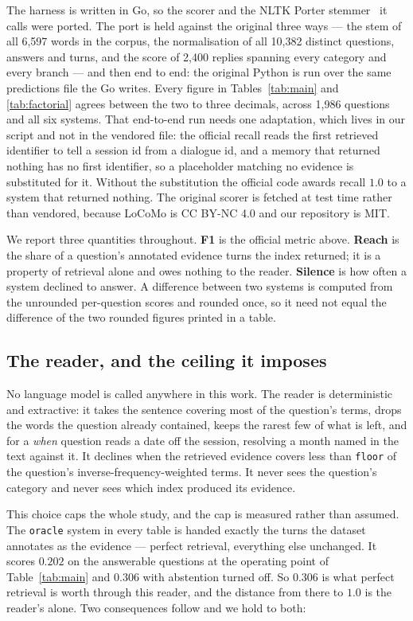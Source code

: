 \documentclass[11pt]{article}
\newcommand{\arm}[1]{\texttt{#1}}
\begin{document}
The harness is written in Go, so the scorer and the NLTK Porter
stemmer~\cite{porter,nltk} it calls were ported. The port is held against the
original three ways --- the stem of all 6{,}597 words in the corpus, the
normalisation of all 10{,}382 distinct questions, answers and turns, and the
score of 2{,}400 replies spanning every category and every branch --- and then
end to end: the original Python is run over the same predictions file the Go
writes. Every figure in Tables~\ref{tab:main} and \ref{tab:factorial} agrees
between the two to three decimals, across 1{,}986 questions and all six systems.
That end-to-end run needs one adaptation, which lives in our script and not in
the vendored file: the official recall reads the first retrieved identifier to
tell a session id from a dialogue id, and a memory that returned nothing has no
first identifier, so a placeholder matching no evidence is substituted for it.
Without the substitution the official code awards recall $1.0$ to a system that
returned nothing. The original scorer is fetched at test time rather than
vendored, because LoCoMo is CC BY-NC 4.0 and our repository is MIT.

We report three quantities throughout. \textbf{F1} is the official metric above.
\textbf{Reach} is the share of a question's annotated evidence turns the index
returned; it is a property of retrieval alone and owes nothing to the reader.
\textbf{Silence} is how often a system declined to answer. A difference between
two systems is computed from the unrounded per-question scores and rounded
once, so it need not equal the difference of the two rounded figures printed in
a table.

\subsection{The reader, and the ceiling it imposes}
\label{sec:reader}

No language model is called anywhere in this work. The reader is deterministic
and extractive: it takes the sentence covering most of the question's terms,
drops the words the question already contained, keeps the rarest few of what is
left, and for a \emph{when} question reads a date off the session, resolving a
month named in the text against it. It declines when the retrieved evidence
covers less than \texttt{floor} of the question's inverse-frequency-weighted
terms. It never sees the question's category and never sees which index
produced its evidence.

This choice caps the whole study, and the cap is measured rather than assumed.
The \arm{oracle} system in every table is handed exactly the turns the dataset
annotates as the evidence --- perfect retrieval, everything else unchanged. It
scores $0.202$ on the answerable questions at the operating point of
Table~\ref{tab:main} and $0.306$ with abstention turned off. So
$0.306$ is what perfect retrieval is worth through this reader, and the
distance from there to $1.0$ is the reader's alone. Two consequences follow and
we hold to both:
\end{document}
